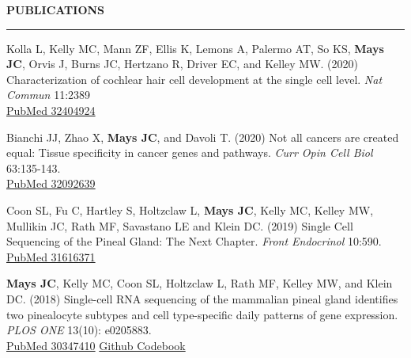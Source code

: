 \documentclass[11pt, letterpaper]{article}
\newenvironment{CVSection}{
\begin{addmargin}[2em]{0em}
\begin{samepage}}
{\end{samepage}
\end{addmargin}\bigskip}
\newcommand{\CVHeading}[1]{
\MakeUppercase{\bf #1}
\smallskip
\hrule
\medskip
}
\begin{document}


\CVHeading{Publications}
\begin{CVSection}

Kolla L, Kelly MC, Mann ZF, Ellis K, Lemons A, Palermo AT, So KS, \textbf{Mays JC}, Orvis J, Burns JC, Hertzano R, Driver EC, and Kelley MW. (2020) Characterization of cochlear hair cell development at the single cell level. \emph{Nat Commun} 11:2389\\
\hspace{2 in}\href{https://www.ncbi.nlm.nih.gov/pubmed/32404924}{\faFileTextO\hspace{1mm}PubMed 32404924}\medskip

Bianchi JJ, Zhao X, \textbf{Mays JC}, and Davoli T. (2020) Not all cancers are created equal: Tissue specificity in cancer genes and pathways. \emph{Curr Opin Cell Biol} 63:135-143.\\
\hspace{2 in}\href{https://www.ncbi.nlm.nih.gov/pubmed/32092639}{\faFileTextO\hspace{1mm}PubMed 32092639}\medskip

Coon SL, Fu C, Hartley S, Holtzclaw L, \textbf{Mays JC}, Kelly MC, Kelley MW, Mullikin JC, Rath MF, Savastano LE and Klein DC. (2019) Single Cell Sequencing of the Pineal Gland: The Next Chapter. \emph{Front Endocrinol} 10:590.\\
\hspace{2 in}\href{https://www.ncbi.nlm.nih.gov/pubmed/31616371}{\faFileTextO\hspace{1mm}PubMed 31616371}\medskip

\textbf{Mays JC}, Kelly MC, Coon SL, Holtzclaw L, Rath MF, Kelley MW, and Klein DC. (2018) Single-cell RNA sequencing of the mammalian pineal gland identifies two pinealocyte subtypes and cell type-specific daily patterns of gene expression. \emph{PLOS ONE} 13(10): e0205883.\\
\hspace{2 in}\href{https://www.ncbi.nlm.nih.gov/pubmed/30347410}{\faFileTextO\hspace{1mm}PubMed 30347410}
\hspace{2mm}\href{https://github.com/joeymays/PinealGland_SingleCell}{\faCode\hspace{1mm}Github Codebook}\medskip

\end{CVSection}
\end{document}
